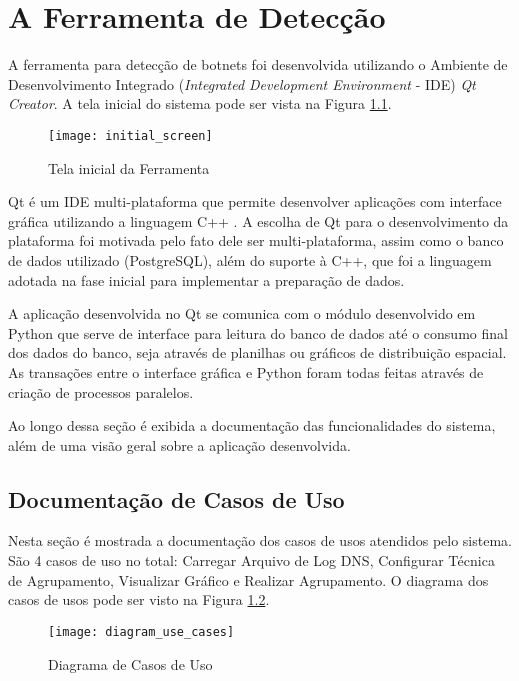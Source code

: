 \chapter{A Ferramenta de Detecção}
A ferramenta para detecção de botnets foi desenvolvida utilizando o Ambiente de Desenvolvimento Integrado (\textit{Integrated Development Environment} - IDE) \textit{Qt Creator}. A tela inicial do sistema pode ser vista na Figura \ref{fig:initial_screen}.

\begin{figure}
\centering
\texttt{[image: initial\_screen]}
\caption[Tela inicial da Ferramenta]{Tela inicial da Ferramenta} \label{fig:initial_screen}
\end{figure}

Qt é um IDE multi-plataforma que permite desenvolver aplicações com interface gráfica utilizando a linguagem C++ \citep{qtsite}. A escolha de Qt para o desenvolvimento da plataforma foi motivada pelo fato dele ser multi-plataforma, assim como o banco de dados utilizado (PostgreSQL), além do suporte à C++, que foi a linguagem adotada na fase inicial para implementar a preparação de dados.

A aplicação desenvolvida no Qt se comunica com o módulo desenvolvido em Python que serve de interface para leitura do banco de dados até o consumo final dos dados do banco, seja através de planilhas ou gráficos de distribuição espacial. As transações entre o interface gráfica e Python foram todas feitas através de criação de processos paralelos.

Ao longo dessa seção é exibida a documentação das funcionalidades do sistema, além de uma visão geral sobre a aplicação desenvolvida.

\section{Documentação de Casos de Uso}
Nesta seção é mostrada a documentação dos casos de usos atendidos pelo sistema. São 4 casos de uso no total: Carregar Arquivo de Log DNS, Configurar Técnica de Agrupamento, Visualizar Gráfico e Realizar Agrupamento. O diagrama dos casos de usos pode ser visto na Figura \ref{fig:diagram_use_cases}. 

\begin{figure}
\centering
\texttt{[image: diagram\_use\_cases]}
\caption[Diagrama de Casos de Uso]{Diagrama de Casos de Uso} \label{fig:diagram_use_cases}
\end{figure}


